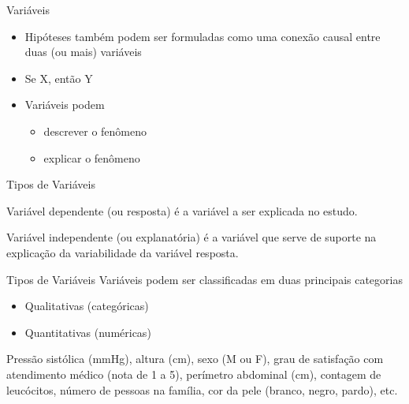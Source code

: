 \documentclass{beamer}
\begin{document}
\begin{frame}{Variáveis}
  \begin{itemize}
  \item Hipóteses também podem ser formuladas como uma conexão causal
    entre duas (ou mais) variáveis
  \item Se X, então Y
  \item Variáveis podem
    \begin{itemize}
    \item descrever o fenômeno
    \item explicar o fenômeno
    \end{itemize}
  \end{itemize}
\end{frame}

\begin{frame}{Tipos de Variáveis}
  \begin{definition}
    Variável \alert{dependente} (ou resposta) é a variável a ser
    explicada no estudo.
  \end{definition}
  \begin{definition}
    Variável \alert{independente} (ou explanatória) é a variável que
    serve de suporte na explicação da variabilidade da variável
    resposta.
  \end{definition}
\end{frame}

\begin{frame}{Tipos de Variáveis}
Variáveis podem ser classificadas em duas principais categorias
  \begin{itemize}
  \item Qualitativas (categóricas)
  \item Quantitativas (numéricas)
  \end{itemize}
  \begin{example}
    Pressão sistólica (mmHg), altura (cm), sexo (M ou F), grau de
    satisfação com atendimento médico (nota de 1 a 5), perímetro
    abdominal (cm), contagem de leucócitos, número de pessoas na
    família, cor da pele (branco, negro, pardo), etc.
  \end{example}
\end{frame}
\end{document}

